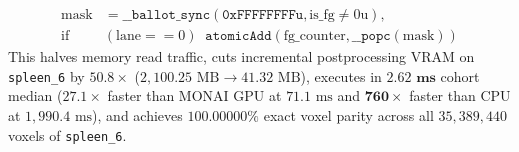 \documentclass[10pt,twocolumn]{article}
\begin{document}
\begin{equation}
\begin{aligned}
    \text{mask} &= \texttt{\_\_ballot\_sync}(\texttt{0xFFFFFFFFu}, \text{is\_fg} \neq 0\text{u}), \\
    \text{if } &(\text{lane} == 0) \;\; \texttt{atomicAdd}(\text{fg\_counter}, \texttt{\_\_popc}(\text{mask}))
\end{aligned}
\end{equation}
This halves memory read traffic, cuts incremental postprocessing VRAM on \texttt{spleen\_6} by $\mathbf{50.8\times}$ ($2,100.25\text{ MB} \to 41.32\text{ MB}$), executes in $\mathbf{2.62\textbf{ ms}}$ cohort median ($\mathbf{27.1\times}$ faster than MONAI GPU at $71.1\text{ ms}$ and $\mathbf{760\times}$ faster than CPU at $1,990.4\text{ ms}$), and achieves $\mathbf{100.00000\%}$ exact voxel parity across all $35,389,440$ voxels of \texttt{spleen\_6}.
\end{document}
